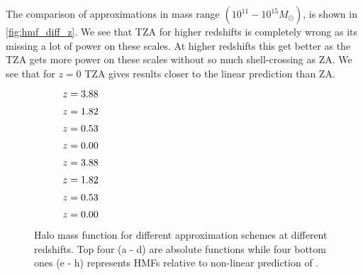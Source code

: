 The comparison of approximations in mass range $(10^{11}-10^{15}M_\odot)$, is shown in \autoref{fig:hmf_diff_z}. We see that TZA for higher redshifts is completely wrong as its missing a lot of power on these scales. At higher redshifts this get better as the TZA gets more power on these scales without so much shell-crossing as ZA. We see that for $z=0$ TZA gives results closer to the linear prediction than ZA.
\begin{figure*}[p]
	\centering
	\begin{subfigure}{1.0\textwidth}
	\end{subfigure}
	\begin{subfigure}{0.5\textwidth}
		\caption{$z=3.88$}
	\end{subfigure}%
	\begin{subfigure}{0.5\textwidth}
		\caption{$z=1.82$}
	\end{subfigure}
	\begin{subfigure}{0.5\textwidth}
		\caption{$z=0.53$}
	\end{subfigure}%
	\begin{subfigure}{0.5\textwidth}
		\caption{$z=0.00$}
	\end{subfigure}
	\begin{subfigure}{0.5\textwidth}
		\caption{$z=3.88$}
	\end{subfigure}%
	\begin{subfigure}{0.5\textwidth}
		\caption{$z=1.82$}
	\end{subfigure}
	\begin{subfigure}{0.5\textwidth}
		\caption{$z=0.53$}
	\end{subfigure}%
	\begin{subfigure}{0.5\textwidth}
		\caption{$z=0.00$}
	\end{subfigure}
	\caption{Halo mass function for different approximation schemes at different redshifts. Top four (a - d) are absolute functions while four bottom ones (e - h) represents HMFs relative to non-linear prediction of \LCDM.}
	\label{fig:hmf_diff_z}
\end{figure*}

